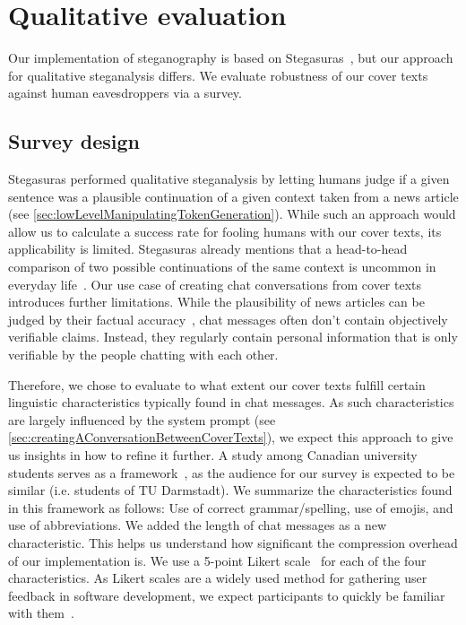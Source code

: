 \section{Qualitative evaluation}
\label{sec:qualitativeEvaluation}
Our implementation of steganography is based on Stegasuras~\cite{zieglerNeuralLinguisticSteganography2019}, but our approach for qualitative steganalysis differs. We evaluate robustness of our cover texts against human eavesdroppers via a survey.

\subsection{Survey design}
\label{sec:surveyDesign}
Stegasuras performed qualitative steganalysis by letting humans judge if a given sentence was a plausible continuation of a given context taken from a news article (see \cref{sec:lowLevelManipulatingTokenGeneration}). While such an approach would allow us to calculate a success rate for fooling humans with our cover texts, its applicability is limited. Stegasuras already mentions that a head-to-head comparison of two possible continuations of the same context is uncommon in everyday life~\cite{zieglerNeuralLinguisticSteganography2019}. Our use case of creating chat conversations from cover texts introduces further limitations. While the plausibility of news articles can be judged by their factual accuracy~\cite{zieglerNeuralLinguisticSteganography2019}, chat messages often don't contain objectively verifiable claims. Instead, they regularly contain personal information that is only verifiable by the people chatting with each other.

Therefore, we chose to evaluate to what extent our cover texts fulfill certain linguistic characteristics typically found in chat messages. As such characteristics are largely influenced by the system prompt (see \cref{sec:creatingAConversationBetweenCoverTexts}), we expect this approach to give us insights in how to refine it further. A study among Canadian university students serves as a framework~\cite{alazzawieLinguisticSituationalFeatures2022}, as the audience for our survey is expected to be similar (i.e. students of TU Darmstadt). We summarize the characteristics found in this framework as follows: Use of correct grammar/spelling, use of emojis, and use of abbreviations. We added the length of chat messages as a new characteristic. This helps us understand how significant the compression overhead of our implementation is. We use a 5-point Likert scale~\cite{likertTechniqueMeasurementAttitudes1932} for each of the four characteristics. As Likert scales are a widely used method for gathering user feedback in software development, we expect participants to quickly be familiar with them~\cite{girayAssessmentStudentSatisfaction2021,tizardVoiceUsersExtended2022}.

